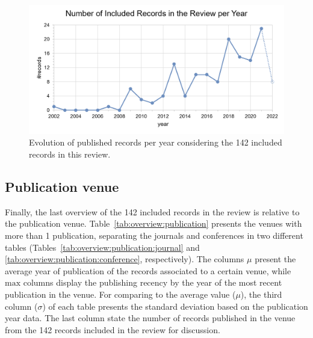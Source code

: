\begin{figure}[!h]
  \centering
  \includegraphics[width=\columnwidth]{figures/year.png}
  \caption{Evolution of published records per year considering the 142 included records in this review.}
  \label{fig:overview:year}
\end{figure}

\subsection{Publication venue}
\label{sec:overview:publication}

Finally, the last overview of the 142 included records in the review is relative to the publication venue. Table~\ref{tab:overview:publication} presents the venues with more than 1 publication, separating the journals and conferences in two different tables (Tables~\ref{tab:overview:publication:journal} and \ref{tab:overview:publication:conference}, respectively).
The columns $\mu$ present the average year of publication of the records associated to a certain venue, while $\text{max}$ columns display the publishing recency by the year of the most recent publication in the venue. For comparing to the average value ($\mu$), the third column ($\sigma$) of each table presents the standard deviation based on the publication year data.
The last column state the number of records published in the venue from the 142 records included in the review for discussion.

